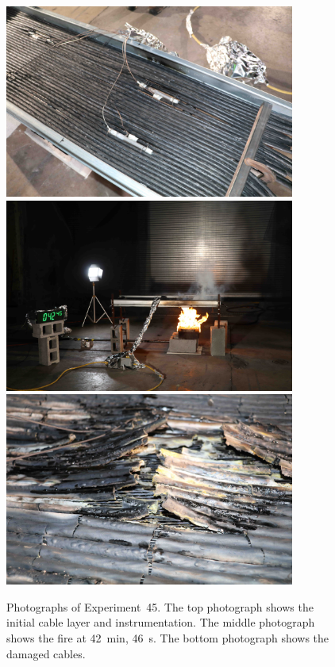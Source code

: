 \begin{figure}[p]
\centering
\includegraphics[height=2.50in]{../FIGURES/Test_45_setup} \\
\includegraphics[height=2.50in]{../FIGURES/Test_45_42_min_46_s} \\
\includegraphics[height=2.50in]{../FIGURES/Test_45_damage}
\caption[Photographs of Experiment~45]{Photographs of Experiment~45. The top photograph shows the initial cable layer and instrumentation. The middle photograph shows the fire at 42~min, 46~s. The bottom photograph shows the damaged cables.}
\label{fig:Test_45_photos}
\end{figure}


\clearpage

